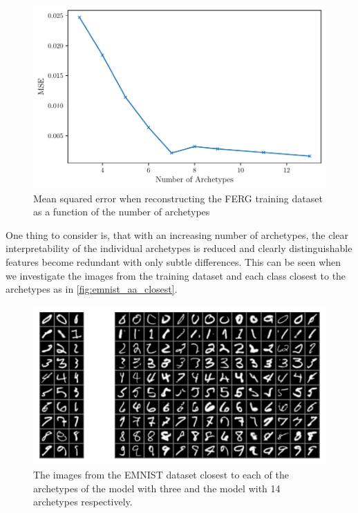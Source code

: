 \begin{figure}[htpb]
	\centering
	\includegraphics{figures/samples/aa_mse_FERG.pdf}
	\caption{Mean squared error when reconstructing the FERG training
		dataset as a function of the number of archetypes}%
	\label{fig:ferg_aa_mse}
\end{figure}

One thing to consider is, that with an increasing number of archetypes, the
clear interpretability of the individual archetypes is reduced and clearly
distinguishable features become redundant with only subtle differences. This
can be seen when we investigate the images from the training dataset and each
class closest to the archetypes as in \autoref{fig:emnist_aa_closest}.

\begin{figure}[htpb]
	\centering
	\includegraphics{figures/samples/archetypes_emnist.pdf}
	\caption{The images from the EMNIST dataset closest to each of the
		archetypes of the model with three and the model with 14 archetypes
		respectively.}%
	\label{fig:emnist_aa_closest}
\end{figure}

